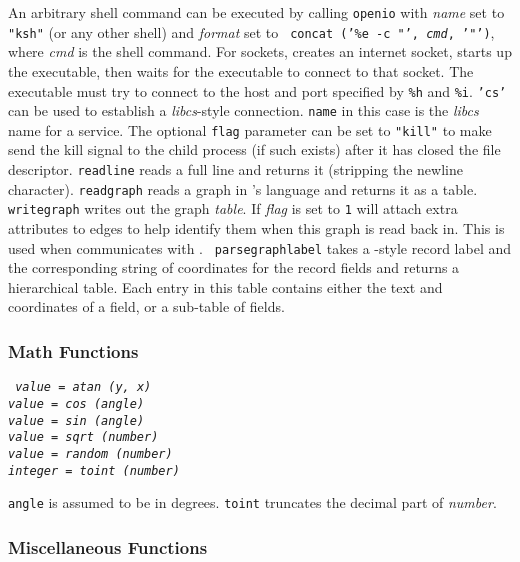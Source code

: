 An arbitrary shell command can be executed by calling {\tt openio} with {\it
name} set to {\tt "ksh"} (or any other shell) and {\it format} set to {\tt
concat ('\%e -c "', {\it cmd}, '"')}, where {\it cmd} is the shell command.
For sockets, {\LEFTY} creates an internet socket, starts up the executable,
then waits for the executable to connect to that socket. The executable must
try to connect to the host and port specified by {\tt \%h} and {\tt \%i}.
{\tt 'cs'} can be used
to establish a {\it libcs}-style connection. {\tt name} in this case is the
{\it libcs} name for a service. The optional {\tt flag} parameter can be set to
{\tt "kill"} to make {\LEFTY} send the kill signal to the child process (if
such exists) after it has closed the file descriptor.  {\tt readline} reads a
full line and returns it (stripping the newline character). {\tt readgraph}
reads a graph in {\DOT}'s language and returns it as a table. {\tt writegraph}
writes out the graph {\it table}. If {\it flag} is set to {\tt 1} {\LEFTY}
will attach extra attributes to edges to help identify them when this graph
is read back in. This is used when {\LEFTY} communicates with {\DOT}. {\tt
parsegraphlabel} takes a {\DOT}-style record label and the corresponding string
of coordinates for the record fields and returns a hierarchical table.  Each
entry in this table contains either the text and coordinates of a field, or a
sub-table of fields.

\subsubsection{Math Functions}

\begin{flushleft}\tt
\it value \tt = atan (\it y, x\tt )\\
\it value \tt = cos (\it angle\tt )\\
\it value \tt = sin (\it angle\tt )\\
\it value \tt = sqrt (\it number\tt )\\
\it value \tt = random (\it number\tt )\\
\it integer \tt = toint (\it number\tt )
\end{flushleft}\vspace{-2\itemsep}
{\tt angle} is assumed to be in degrees. {\tt toint} truncates the decimal part
of {\it number}.

\subsubsection{Miscellaneous Functions}

